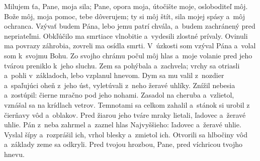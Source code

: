 Milujem ťa, Pane, moja sila;
Pane, opora moja, útočište moje, osloboditeľ môj.
\versseparator
Bože môj, moja pomoc, tebe dôverujem;
\versseparator
ty si môj štít, sila mojej spásy a~môj ochranca.
\versseparator
Vzývať budem Pána, lebo jemu patrí chvála,
a~budem zachránený pred nepriateľmi.
\versseparator
Obkľúčilo ma smrtiace vlnobitie
a~vydesili zlostné prívaly.
\versseparator
Ovinuli ma povrazy záhrobia,
zovreli ma osídla smrti.
\versseparator
V~úzkosti som vzýval Pána
a~volal som k~svojmu Bohu.
\versseparator
Zo svojho chrámu počul môj hlas
a~moje volanie pred jeho tvárou preniklo k~jeho sluchu.
\versseparator
Zem sa pohýbala a~zachvela;
vrchy sa otriasli a~pohli v~základoch,
lebo vzplanul hnevom.
\versseparator
Dym sa mu valil z~nozdier
a~spaľujúci oheň z~jeho úst,
vyletúvali z~neho žeravé uhlíky.
\versseparator
Znížil nebesia a~zostúpil:
čierne mračno pod jeho nohami.
\versseparator
Zasadol na cheruba a~vzlietol,
vznášal sa na krídlach vetrov.
\versseparator
Temnotami sa celkom zahalil
a~stánok si urobil
z čierňavy vôd a~oblakov.
\versseparator
Pred žiarou jeho tváre mraky lietali,
ľadovec a~žeravé uhlie.
\versseparator
Pán z~neba zahrmel
a~zaznel hlas Najvyššieho:
ľadovec a~žeravé uhlie.
\versseparator
Vyslal šípy a~rozprášil ich,
vrhol blesky a~zmietol ich.
\versseparator
Otvorili sa hlbočiny vôd
a~základy zeme sa odkryli.
\versseparator
Pred tvojou hrozbou, Pane,
pred víchricou tvojho hnevu.